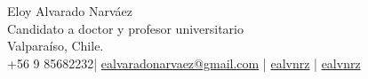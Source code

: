 \documentclass[10pt,a4paper]{article}
\begin{document}
 

\newcommand{\name}{Eloy Alvarado Narváez}
\newcommand{\datebirth}{18 de agosto, 1990}
\newcommand{\address}{Valparaíso, Chile.}
\newcommand{\phone}{+56 9 85682232}
\newcommand{\email}{ealvaradonarvaez@gmail.com}
\newcommand{\github}{ealvnrz}
\newcommand{\linkedin}{ealvnrz}

\begin{center}
\huge\name\\
\normalsize Candidato a doctor y profesor universitario\\
\address\\
 \phone \hspace{5pt}|\hspace{5pt}  \href{mailto:\email}{\email}
\hspace{5pt}|\hspace{5pt}  \href{https://github.com/ealvnrz}{\github}
\hspace{5pt}|\hspace{5pt}  \href{https://www.linkedin.com/in/ealvnrz/}{\linkedin}
\end{center}






\end{document}
